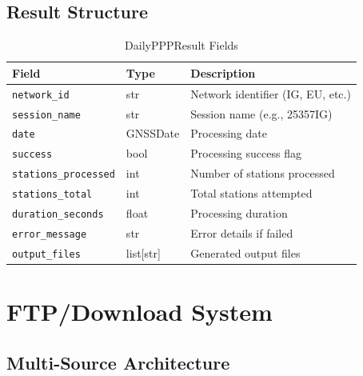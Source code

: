 \documentclass[11pt,a4paper,twoside]{report}
\newcommand{\code}[1]{\texttt{\small\color{primaryblue}#1}}
\begin{document}
\section{Result Structure}

\begin{table}[H]
\centering
\caption{DailyPPPResult Fields}
\label{tab:result-fields}
\begin{tabular}{@{}llp{5cm}@{}}
\toprule
\textbf{Field} & \textbf{Type} & \textbf{Description} \\
\midrule
\code{network\_id} & str & Network identifier (IG, EU, etc.) \\
\code{session\_name} & str & Session name (e.g., 25357IG) \\
\code{date} & GNSSDate & Processing date \\
\code{success} & bool & Processing success flag \\
\code{stations\_processed} & int & Number of stations processed \\
\code{stations\_total} & int & Total stations attempted \\
\code{duration\_seconds} & float & Processing duration \\
\code{error\_message} & str & Error details if failed \\
\code{output\_files} & list[str] & Generated output files \\
\bottomrule
\end{tabular}
\end{table}

\chapter{FTP/Download System}

\section{Multi-Source Architecture}
\end{document}
